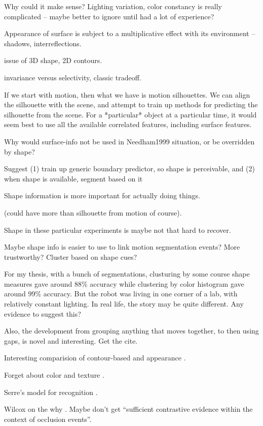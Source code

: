 Why could it make sense?  Lighting variation, color constancy is
really complicated -- maybe better to ignore until had a lot
of experience?

Appearance of surface is subject to a multiplicative effect
with its environment -- shadows, interreflections.

issue of 3D shape, 2D contours.

invariance versus selectivity, classic tradeoff.

If we start with motion, then what we have is motion silhouettes.
We can align the silhouette with the scene, and attempt to train
up methods for predicting the silhouette from the scene.
For a *particular* object at a particular time, it would seem 
best to use all the available correlated features, including 
surface features.  

Why would surface-info not be used in Needham1999 situation,
or be overridden by shape?

Suggest (1) train up generic boundary predictor, so
shape is perceivable, and (2) when shape is available,
segment based on it

Shape information is more important for actually doing things.

(could have more than silhouette from motion of course).


Shape in these particular experiments is maybe not that hard to
recover.

Maybe shape info is easier to use to link motion segmentation
events?  More trustworthy?  Cluster based on shape cues?

For my thesis, with a bunch of segmentations, clusturing by
some course shape measures gave around 88\% accuracy while
clustering by color histogram gave around 99\% accuracy.
But the robot was living in one corner of a lab, with 
relatively constant lighting.  In real life, the story may
be quite different.  Any evidence to suggest this?

Also, the development from grouping anything that moves
together, to then using gaps, is novel and interesting.
Get the cite.

Interesting comparision of contour-based
and appearance \cite{leibe03analyzing}.

Forget about color and texture \cite{lecun04learning}.

Serre's model for recognition \cite{serre05object}.


Wilcox on the why \cite{wilcox99object}.  Maybe don't get
``sufficient contrastive evidence within the context of
occlusion events''.

